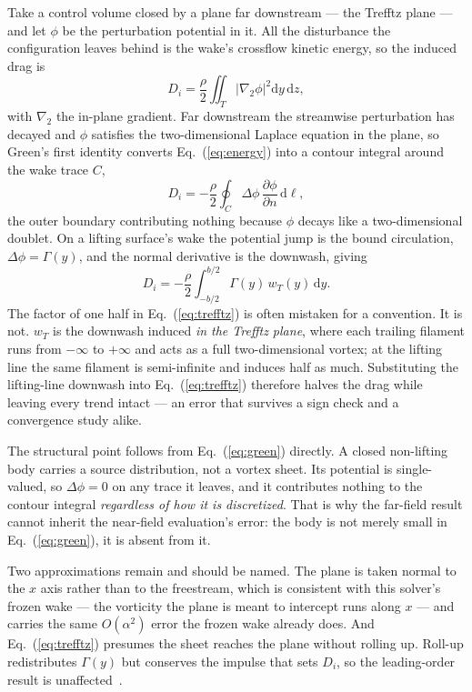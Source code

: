 \documentclass[submit]{aiaa-tc}%
\newcommand{\eqnref}[1]{(\ref{#1})}
\begin{document}
Take a control volume closed by a plane far downstream --- the Trefftz
plane --- and let $\phi$ be the perturbation potential in it. All the
disturbance the configuration leaves behind is the wake's crossflow
kinetic energy, so the induced drag is
%
\begin{equation}
  \label{eq:energy}
  D_i = \frac{\rho}{2}\iint_{T}\left|\nabla_{\!2}\phi\right|^2
        \mathrm{d}y\,\mathrm{d}z ,
\end{equation}
%
with $\nabla_{\!2}$ the in-plane gradient. Far downstream the streamwise
perturbation has decayed and $\phi$ satisfies the two-dimensional Laplace
equation in the plane, so Green's first identity converts
Eq.~\eqnref{eq:energy} into a contour integral around the wake trace $C$,
%
\begin{equation}
  \label{eq:green}
  D_i = -\frac{\rho}{2}\oint_{C}\Delta\phi\,
        \frac{\partial\phi}{\partial n}\,\mathrm{d}\ell ,
\end{equation}
%
the outer boundary contributing nothing because $\phi$ decays like a
two-dimensional doublet. On a lifting surface's wake the potential jump is
the bound circulation, $\Delta\phi = \Gamma(y)$, and the normal derivative
is the downwash, giving
%
\begin{equation}
  \label{eq:trefftz}
  D_i = -\frac{\rho}{2}\int_{-b/2}^{b/2}\Gamma(y)\,w_T(y)\,\mathrm{d}y .
\end{equation}
%
The factor of one half in Eq.~\eqnref{eq:trefftz} is often mistaken for a
convention. It is not. $w_T$ is the downwash induced \emph{in the Trefftz
plane}, where each trailing filament runs from $-\infty$ to $+\infty$ and
acts as a full two-dimensional vortex; at the lifting line the same
filament is semi-infinite and induces half as much. Substituting the
lifting-line downwash into Eq.~\eqnref{eq:trefftz} therefore halves the
drag while leaving every trend intact --- an error that survives a sign
check and a convergence study alike.

The structural point follows from Eq.~\eqnref{eq:green} directly. A closed
non-lifting body carries a source distribution, not a vortex sheet. Its
potential is single-valued, so $\Delta\phi = 0$ on any trace it leaves,
and it contributes nothing to the contour integral \emph{regardless of how
it is discretized}. That is why the far-field result cannot inherit the
near-field evaluation's error: the body is not merely small in
Eq.~\eqnref{eq:green}, it is absent from it.

Two approximations remain and should be named. The plane is taken normal
to the $x$ axis rather than to the freestream, which is consistent with
this solver's frozen wake --- the vorticity the plane is meant to
intercept runs along $x$ --- and carries the same $O(\alpha^2)$ error the
frozen wake already does. And Eq.~\eqnref{eq:trefftz} presumes the sheet
reaches the plane without rolling up. Roll-up redistributes $\Gamma(y)$
but conserves the impulse that sets $D_i$, so the leading-order result is
unaffected~\cite{katzPlotkin2001}.
\end{document}
